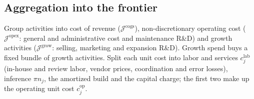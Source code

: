 \subsection{Aggregation into the frontier}\label{sec:tasks-aggregation}

Group activities into cost of revenue ($\mathcal J^{\mathrm{cogs}}$), non-discretionary operating cost ($\mathcal J^{\mathrm{opex}}$: general and administrative cost and maintenance R\&D) and growth activities ($\mathcal J^{\mathrm{grow}}$: selling, marketing and expansion R\&D). Growth spend buys a fixed bundle of growth activities. Split each unit cost into labor and services $c^{\mathrm{lab}}_j$ (in-house and review labor, vendor prices, coordination and error losses), inference $\pi n_j$, the amortized build and the capital charge; the first two make up the operating unit cost $c^{\mathrm{op}}_j$.

